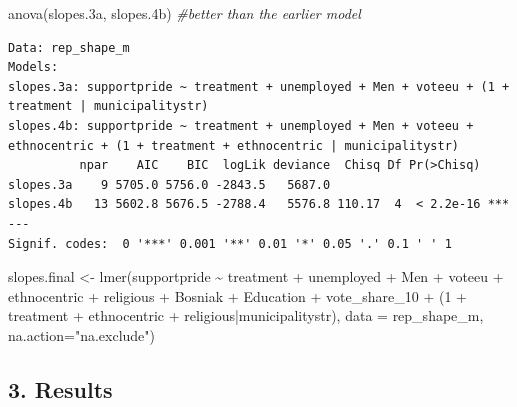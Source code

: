 \documentclass[
]{article}
\newenvironment{Shaded}{\begin{snugshade}}{\end{snugshade}}
\newcommand{\AttributeTok}[1]{\textcolor[rgb]{0.77,0.63,0.00}{#1}}
\newcommand{\CommentTok}[1]{\textcolor[rgb]{0.56,0.35,0.01}{\textit{#1}}}
\newcommand{\DecValTok}[1]{\textcolor[rgb]{0.00,0.00,0.81}{#1}}
\newcommand{\FloatTok}[1]{\textcolor[rgb]{0.00,0.00,0.81}{#1}}
\newcommand{\FunctionTok}[1]{\textcolor[rgb]{0.00,0.00,0.00}{#1}}
\newcommand{\NormalTok}[1]{#1}
\newcommand{\OtherTok}[1]{\textcolor[rgb]{0.56,0.35,0.01}{#1}}
\newcommand{\SpecialCharTok}[1]{\textcolor[rgb]{0.00,0.00,0.00}{#1}}
\newcommand{\StringTok}[1]{\textcolor[rgb]{0.31,0.60,0.02}{#1}}
\begin{document}
\begin{Shaded}
\begin{Highlighting}[]
\FunctionTok{anova}\NormalTok{(slopes}\FloatTok{.3}\NormalTok{a, slopes}\FloatTok{.4}\NormalTok{b) }\CommentTok{\#better than the earlier model}
\end{Highlighting}
\end{Shaded}

\begin{verbatim}
Data: rep_shape_m
Models:
slopes.3a: supportpride ~ treatment + unemployed + Men + voteeu + (1 + treatment | municipalitystr)
slopes.4b: supportpride ~ treatment + unemployed + Men + voteeu + ethnocentric + (1 + treatment + ethnocentric | municipalitystr)
          npar    AIC    BIC  logLik deviance  Chisq Df Pr(>Chisq)    
slopes.3a    9 5705.0 5756.0 -2843.5   5687.0                         
slopes.4b   13 5602.8 5676.5 -2788.4   5576.8 110.17  4  < 2.2e-16 ***
---
Signif. codes:  0 '***' 0.001 '**' 0.01 '*' 0.05 '.' 0.1 ' ' 1
\end{verbatim}

\begin{Shaded}
\begin{Highlighting}[]
\NormalTok{slopes.final }\OtherTok{\textless{}{-}} \FunctionTok{lmer}\NormalTok{(supportpride }\SpecialCharTok{\textasciitilde{}}\NormalTok{ treatment }\SpecialCharTok{+}\NormalTok{ unemployed }\SpecialCharTok{+}\NormalTok{ Men }\SpecialCharTok{+}\NormalTok{ voteeu }\SpecialCharTok{+}\NormalTok{ ethnocentric }\SpecialCharTok{+} 
\NormalTok{                       religious }\SpecialCharTok{+}\NormalTok{ Bosniak }\SpecialCharTok{+}\NormalTok{ Education }\SpecialCharTok{+}\NormalTok{ vote\_share\_10 }\SpecialCharTok{+} 
\NormalTok{                        (}\DecValTok{1} \SpecialCharTok{+}\NormalTok{ treatment }\SpecialCharTok{+}\NormalTok{ ethnocentric }\SpecialCharTok{+}\NormalTok{ religious}\SpecialCharTok{|}\NormalTok{municipalitystr),}
                           \AttributeTok{data =}\NormalTok{ rep\_shape\_m, }\AttributeTok{na.action=}\StringTok{"na.exclude"}\NormalTok{)}
\end{Highlighting}
\end{Shaded}

\hypertarget{results}{%
\subsection{3. Results}\label{results}}
\end{document}
